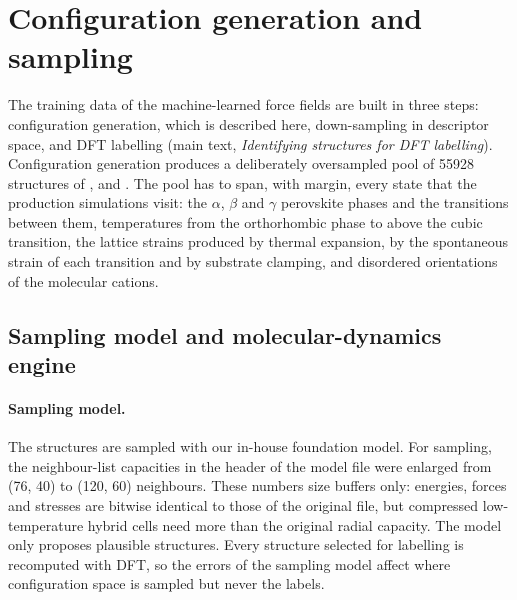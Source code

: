 
\section{Configuration generation and sampling}
\label{sec:configgen}

The training data of the machine-learned force fields are built in three steps: configuration
generation, which is described here, down-sampling in descriptor space, and DFT labelling (main
text, \emph{Identifying structures for DFT labelling}). Configuration generation produces a
deliberately oversampled pool of \num{55928} structures of \CsSnI{}, \MASnI{} and \FASnI{}. The pool
has to span, with margin, every state that the production simulations visit: the $\alpha$, $\beta$
and $\gamma$ perovskite phases and the transitions between them, temperatures from the orthorhombic
phase to above the cubic transition, the lattice strains produced by thermal expansion, by the
spontaneous strain of each transition and by substrate clamping, and disordered orientations of the
molecular cations.

\subsection{Sampling model and molecular-dynamics engine}
\label{sec:configgen:engine}

\paragraph{Sampling model.} The structures are sampled with our in-house foundation model. For
sampling, the neighbour-list capacities in the header of the model file were enlarged from (76, 40)
to (120, 60) neighbours. These numbers size buffers only: energies, forces and stresses are bitwise
identical to those of the original file, but compressed low-temperature hybrid cells need more than
the original radial capacity. The model only proposes plausible structures. Every structure selected
for labelling is recomputed with DFT, so the errors of the sampling model affect where configuration
space is sampled but never the labels.

